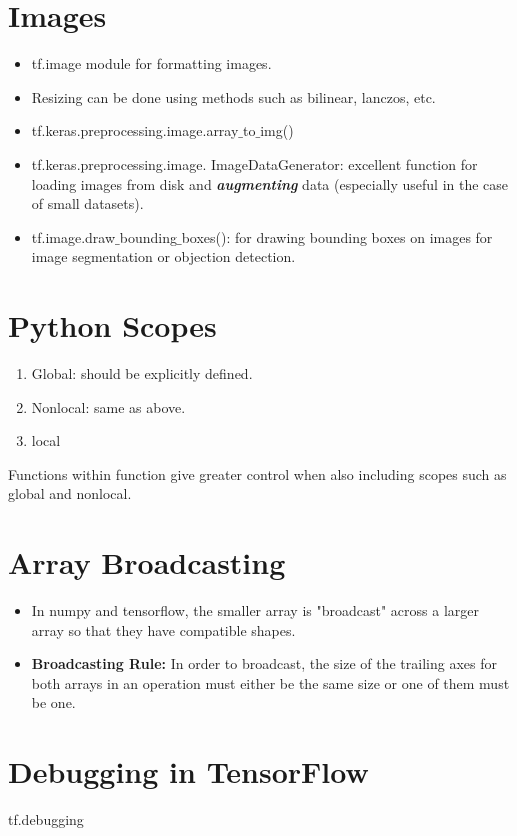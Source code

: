 \documentclass[11pt]{article}
\begin{document}
\begin{multicols*}{2}
\section{Images}
\begin{itemize}
\item tf.image module for formatting images.
\item Resizing can be done using methods such as bilinear, lanczos, etc.
\item tf.keras.preprocessing.image.array$\_$to$\_$img()
\item tf.keras.preprocessing.image. ImageDataGenerator: excellent function for loading images from disk and \textbf{\textit{augmenting}} data (especially useful in the case of small datasets).
\item tf.image.draw$\_$bounding$\_$boxes(): for drawing bounding boxes on images for image segmentation or objection detection.
\end{itemize}

\section{Python Scopes}
\begin{enumerate}
\item Global: should be explicitly defined.
\item Nonlocal: same as above.
\item local

\end{enumerate}

Functions within function give greater control when also including scopes such as global and nonlocal.

\section{Array Broadcasting}
\begin{itemize}
\item In numpy and tensorflow, the smaller array is "broadcast" across a larger array so that they have compatible shapes.
\item \textbf{Broadcasting Rule:} In order to broadcast, the size of the trailing axes for both arrays in an operation must either be the same size or one of them must be one.
\end{itemize}

\section{Debugging in TensorFlow}
tf.debugging


\end{multicols*}
\end{document}
